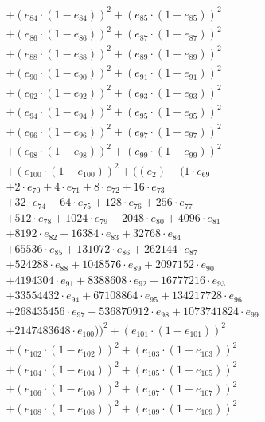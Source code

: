 \documentclass[10pt, a4paper]{article}
\begin{document}
\begin{align*}
& + (e_{84} \cdot (1 - e_{84}))^{2} + (e_{85} \cdot (1 - e_{85}))^{2} \\
& + (e_{86} \cdot (1 - e_{86}))^{2} + (e_{87} \cdot (1 - e_{87}))^{2} \\
& + (e_{88} \cdot (1 - e_{88}))^{2} + (e_{89} \cdot (1 - e_{89}))^{2} \\
& + (e_{90} \cdot (1 - e_{90}))^{2} + (e_{91} \cdot (1 - e_{91}))^{2} \\
& + (e_{92} \cdot (1 - e_{92}))^{2} + (e_{93} \cdot (1 - e_{93}))^{2} \\
& + (e_{94} \cdot (1 - e_{94}))^{2} + (e_{95} \cdot (1 - e_{95}))^{2} \\
& + (e_{96} \cdot (1 - e_{96}))^{2} + (e_{97} \cdot (1 - e_{97}))^{2} \\
& + (e_{98} \cdot (1 - e_{98}))^{2} + (e_{99} \cdot (1 - e_{99}))^{2} \\
& + (e_{100} \cdot (1 - e_{100}))^{2} + ((e_{2}) - (1 \cdot e_{69} \\
& + 2 \cdot e_{70} + 4 \cdot e_{71} + 8 \cdot e_{72} + 16 \cdot e_{73} \\
& + 32 \cdot e_{74} + 64 \cdot e_{75} + 128 \cdot e_{76} + 256 \cdot e_{77} \\
& + 512 \cdot e_{78} + 1024 \cdot e_{79} + 2048 \cdot e_{80} + 4096 \cdot e_{81} \\
& + 8192 \cdot e_{82} + 16384 \cdot e_{83} + 32768 \cdot e_{84} \\
& + 65536 \cdot e_{85} + 131072 \cdot e_{86} + 262144 \cdot e_{87} \\
& + 524288 \cdot e_{88} + 1048576 \cdot e_{89} + 2097152 \cdot e_{90} \\
& + 4194304 \cdot e_{91} + 8388608 \cdot e_{92} + 16777216 \cdot e_{93} \\
& + 33554432 \cdot e_{94} + 67108864 \cdot e_{95} + 134217728 \cdot e_{96} \\
& + 268435456 \cdot e_{97} + 536870912 \cdot e_{98} + 1073741824 \cdot e_{99} \\
& + 2147483648 \cdot e_{100}))^{2} + (e_{101} \cdot (1 - e_{101}))^{2} \\
& + (e_{102} \cdot (1 - e_{102}))^{2} + (e_{103} \cdot (1 - e_{103}))^{2} \\
& + (e_{104} \cdot (1 - e_{104}))^{2} + (e_{105} \cdot (1 - e_{105}))^{2} \\
& + (e_{106} \cdot (1 - e_{106}))^{2} + (e_{107} \cdot (1 - e_{107}))^{2} \\
& + (e_{108} \cdot (1 - e_{108}))^{2} + (e_{109} \cdot (1 - e_{109}))^{2} \\

\end{align*}
\end{document}

